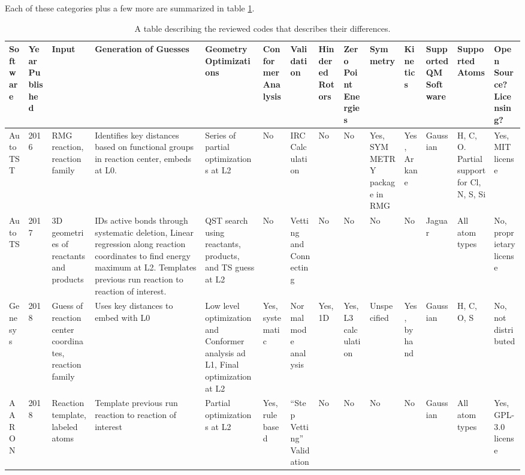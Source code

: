 \documentclass[preprint, 11pt]{elsarticle} %
\begin{document}
Each of these categories plus a few more are summarized in table \ref{table:comparison}. 

\begin{table}[h!]
\caption{A table describing the reviewed codes that describes their differences.}
\label{table:comparison}
\begin{center}
\begin{singlespace}
\begin{adjustbox}{angle=90}
\begin{scriptsize}
\begin{tabular}{m{0.45in}||m{0.25in} | m{0.45in} | m{0.8in} | m{0.7in}| m{0.5in}| m{0.5in }|m{0.45in}| m{0.45in}| m{0.5in}| m{0.45in}| m{0.5in}| m{0.5in} | m{0.45in}}
    
    Software & Year Published & Input & Generation of Guesses & Geometry Optimizations & Conformer Analysis & Validation & Hindered Rotors & Zero Point Energies & Symmetry & Kinetics & Supported QM Software & Supported Atoms & Open Source? Licensing? \\
    \hline
    \hline
    AutoTST & 2016 & RMG reaction, reaction family & Identifies key distances based on functional groups in reaction center, embeds at L0. & Series of partial optimizations at L2 & No & IRC Calculation & No & No & Yes, SYMMETRY package in RMG & Yes, Arkane & Gaussian & H, C, O. Partial support for Cl, N, S, Si & Yes, MIT license \\
    \hline
    AutoTS  & 2017 & 3D geometries of reactants and products & IDs active bonds through systematic deletion, Linear regression along reaction coordinates to find energy maximum at L2. Templates previous run reaction to reaction of interest. & QST search using reactants, products, and TS guess at L2 & No & Vetting and Connecting & No & No & No & No & Jaguar & All atom types & No, proprietary license \\
    \hline 
    Genesys & 2018 & Guess of reaction center coordinates, reaction family & Uses key distances to embed with L0 & Low level optimization and Conformer analysis ad L1, Final optimization at L2 & Yes, systematic & Normal mode analysis & Yes, 1D & Yes, L3 calculation & Unspecified & Yes, by hand & Gaussian& H, C, O, S & No, not distributed \\ 
    \hline
    AARON   & 2018 & Reaction template, labeled atoms & Template previous run reaction to reaction of interest & Partial optimizations at L2 & Yes, rule based & ``Step Vetting'' Validation & No & No & No & No & Gaussian & All atom types & Yes, GPL-3.0 license \\ 

\end{tabular}
\end{scriptsize}
\end{adjustbox}
\end{singlespace}
\end{center}
\end{table}
\end{document}
